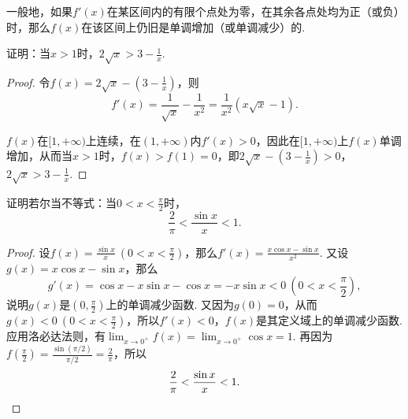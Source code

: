 一般地，如果\(f'(x)\)在某区间内的有限个点处为零，在其余各点处均为正（或负）时，那么\(f(x)\)在该区间上仍旧是单调增加（或单调减少）的.

\begin{example}
证明：当\(x > 1\)时，\(2 \sqrt{x} > 3 - \frac{1}{x}\).
\begin{proof}
令\(f(x) = 2 \sqrt{x} - \left(3 - \frac{1}{x}\right)\)，则\[
f'(x) = \frac{1}{\sqrt{x}} - \frac{1}{x^2}
= \frac{1}{x^2} (x \sqrt{x} - 1).
\]

\(f(x)\)在\([1,+\infty)\)上连续，在\((1,+\infty)\)内\(f'(x) > 0\)，因此在\([1,+\infty)\)上\(f(x)\)单调增加，从而当\(x > 1\)时，\(f(x) > f(1) = 0\)，即\(2 \sqrt{x} - \left(3 - \frac{1}{x}\right) > 0\)，\(2 \sqrt{x} > 3 - \frac{1}{x}\).
\end{proof}
\end{example}

\begin{example}
证明若尔当不等式：当\(0<x<\frac{\pi}{2}\)时，\begin{equation}\label{equation:微分中值定理.若尔当不等式}
\frac{2}{\pi} < \frac{\sin x}{x} < 1.
\end{equation}
\begin{proof}
设\(f(x) = \frac{\sin x}{x}\ (0<x<\frac{\pi}{2})\)，那么\(f'(x) = \frac{x\cos x - \sin x}{x^2}\).
又设\(g(x) = x \cos x - \sin x\)，那么\[
g'(x) = \cos x - x \sin x - \cos x = -x \sin x < 0\ (0<x<\frac{\pi}{2}),
\]说明\(g(x)\)是\((0,\frac{\pi}{2})\)上的单调减少函数.
又因为\(g(0) = 0\)，从而\(g(x) < 0\ (0<x<\frac{\pi}{2})\)，所以\(f'(x) < 0\)，\(f(x)\)是其定义域上的单调减少函数.
应用洛必达法则，有\(\lim_{x\to0^+} f(x) = \lim_{x\to0^+} \cos x = 1\).
再因为\(f(\frac{\pi}{2}) = \frac{\sin(\pi/2)}{\pi/2} = \frac{2}{\pi}\)，所以\[
\frac{2}{\pi} < \frac{\sin x}{x} < 1.
\qedhere
\]
\end{proof}
\end{example}


